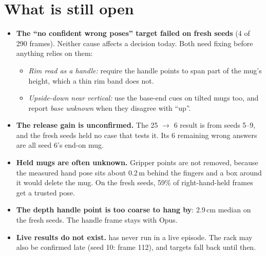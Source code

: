 \documentclass[11pt,a4paper]{article}
\newcommand{\code}[1]{\texttt{\detokenize{#1}}}
\begin{document}
\section{What is still open}\label{sec:open}

\begin{careful}
\begin{itemize}[leftmargin=*]
  \item \textbf{The ``no confident wrong poses'' target failed on fresh seeds} (4 of 290 frames).
        Neither cause affects a decision today. Both need fixing before anything relies on them:
        \begin{itemize}[leftmargin=*]
          \item \emph{Rim read as a handle:} require the handle points to span part of the mug's height, which a thin rim band does not.
          \item \emph{Upside-down near vertical:} use the base-end cues on tilted mugs too, and report \emph{base unknown} when they disagree with ``up''.
        \end{itemize}
  \item \textbf{The release gain is unconfirmed.} The 25 $\to$ 6 result is from seeds 5--9, and the
        fresh seeds held no case that tests it. Its 6 remaining wrong answers are all seed 6's
        end-on mug.
  \item \textbf{Held mugs are often unknown.} Gripper points are not removed, because the
        measured hand pose sits about 0.2\,m behind the fingers and a box around it would delete
        the mug. On the fresh seeds, 59\% of right-hand-held frames get a trusted pose.
  \item \textbf{The depth handle point is too coarse to hang by}: 2.9\,cm median on the fresh seeds.
        The handle frame stays with Opus.
  \item \textbf{Live results do not exist.} \code{depth_pose_anchors} has never run in a live
        episode. The rack may also be confirmed late (seed 10: frame 112), and targets
        fall back until then.
\end{itemize}
\end{careful}
\end{document}
